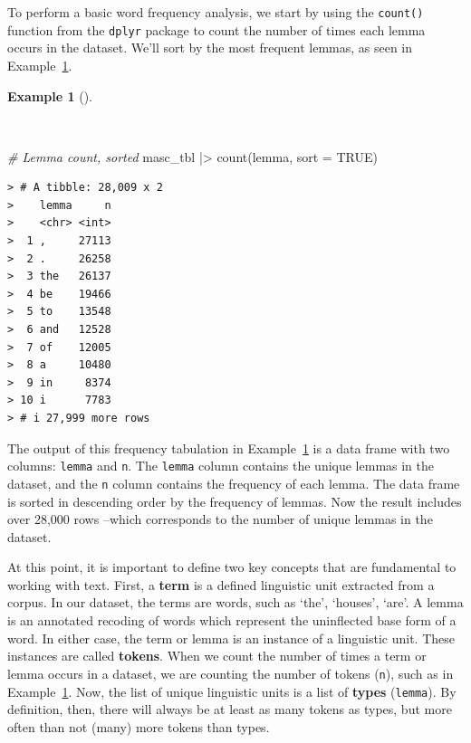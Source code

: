 \documentclass[
  letterpaper,
  DIV=11,
  numbers=noendperiod]{scrreport}
\newenvironment{Shaded}{\begin{snugshade}}{\end{snugshade}}
\newcommand{\AttributeTok}[1]{\textcolor[rgb]{0.00,0.00,0.00}{#1}}
\newcommand{\CommentTok}[1]{\textcolor[rgb]{0.00,0.00,0.00}{\textit{#1}}}
\newcommand{\ConstantTok}[1]{\textcolor[rgb]{0.00,0.00,0.00}{#1}}
\newcommand{\FunctionTok}[1]{\textcolor[rgb]{0.00,0.00,0.00}{#1}}
\newcommand{\NormalTok}[1]{\textcolor[rgb]{0.00,0.00,0.00}{#1}}
\newcommand{\SpecialCharTok}[1]{\textcolor[rgb]{0.00,0.00,0.00}{#1}}
\theoremstyle{definition}
\newtheorem{example}{Example}[chapter]
\theoremstyle{remark}
\begin{document}
To perform a basic word frequency analysis, we start by using the
\texttt{count()} function from the \texttt{dplyr} package to count the
number of times each lemma occurs in the dataset. We'll sort by the most
frequent lemmas, as seen in Example~\ref{exm-eda-masc-count}.

\begin{example}[]\protect\hypertarget{exm-eda-masc-count}{}\label{exm-eda-masc-count}

~

\begin{Shaded}
\begin{Highlighting}[]
\CommentTok{\# Lemma count, sorted}
\NormalTok{masc\_tbl }\SpecialCharTok{|\textgreater{}} 
  \FunctionTok{count}\NormalTok{(lemma, }\AttributeTok{sort =} \ConstantTok{TRUE}\NormalTok{)}
\end{Highlighting}
\end{Shaded}

\begin{verbatim}
> # A tibble: 28,009 x 2
>    lemma     n
>    <chr> <int>
>  1 ,     27113
>  2 .     26258
>  3 the   26137
>  4 be    19466
>  5 to    13548
>  6 and   12528
>  7 of    12005
>  8 a     10480
>  9 in     8374
> 10 i      7783
> # i 27,999 more rows
\end{verbatim}

\end{example}

The output of this frequency tabulation in
Example~\ref{exm-eda-masc-count} is a data frame with two columns:
\texttt{lemma} and \texttt{n}. The \texttt{lemma} column contains the
unique lemmas in the dataset, and the \texttt{n} column contains the
frequency of each lemma. The data frame is sorted in descending order by
the frequency of lemmas. Now the result includes over 28,000 rows
--which corresponds to the number of unique lemmas in the dataset.

At this point, it is important to define two key concepts that are
fundamental to working with text. First, a \textbf{term} is a defined
linguistic unit extracted from a corpus. In our dataset, the terms are
words, such as `the', `houses', `are'. A lemma is an annotated recoding
of words which represent the uninflected base form of a word. In either
case, the term or lemma is an instance of a linguistic unit. These
instances are called \textbf{tokens}. When we count the number of times
a term or lemma occurs in a dataset, we are counting the number of
tokens (\texttt{n}), such as in Example~\ref{exm-eda-masc-count}. Now,
the list of unique linguistic units is a list of \textbf{types}
(\texttt{lemma}). By definition, then, there will always be at least as
many tokens as types, but more often than not (many) more tokens than
types.
\end{document}
